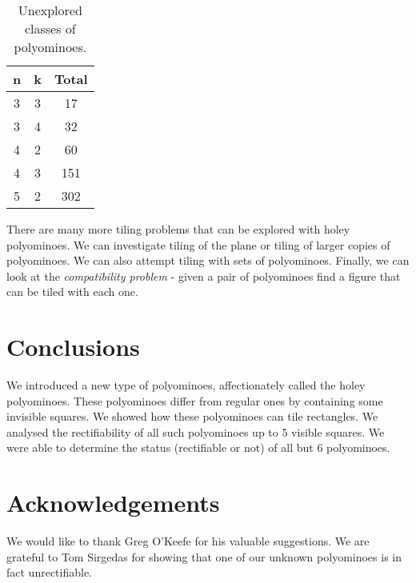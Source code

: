 \documentclass[10pt,a4paper]{article}
\theoremstyle{definition}
\begin{document}
\begin{table}[!htpb]
\centering
\begin{tabular}{|c|c|c|}
\hline
n & k & Total \\ \hline
3 & 3 & 17 \\ \hline
3 & 4 & 32 \\ \hline
4 & 2 & 60 \\ \hline
4 & 3 & 151 \\ \hline
5 & 2 & 302 \\ \hline
\end{tabular}
\caption{Unexplored classes of polyominoes.}
\label{tab:future}
\end{table}

There are many more tiling problems that can be explored with holey polyominoes. We can investigate tiling of the plane
or tiling of larger copies of polyominoes. We can also attempt tiling with sets of polyominoes. Finally, we can look at the
\emph{compatibility problem} - given a pair of polyominoes find a figure that can be tiled with each one.



\section{Conclusions}
We introduced a new type of polyominoes, affectionately called the holey polyominoes.
These polyominoes differ from regular ones by containing some invisible squares. We showed how these
polyominoes can tile rectangles. We analysed the rectifiability of all such polyominoes up to 5 visible squares.
We were able to determine the status (rectifiable or not) of all but 6 polyominoes.


\section{Acknowledgements}
We would like to thank Greg O'Keefe for his valuable suggestions. We are grateful to Tom Sirgedas for showing that one of our unknown
polyominoes is in fact unrectifiable.


\vspace{1cm}


\end{document}
